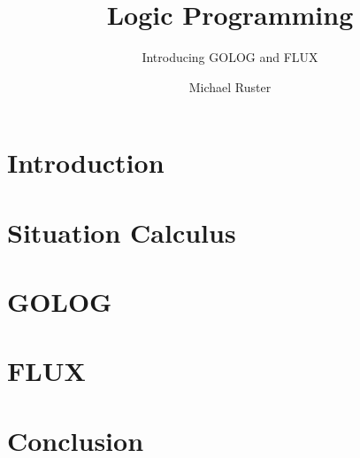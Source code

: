 \documentclass{../template/llncs}
\title{Logic Programming}
\subtitle{Introducing GOLOG and FLUX}
\author{Michael Ruster}
\institute{University Koblenz-Landau}
\begin{document}
\maketitle
\tableofcontents

\section{Introduction}


\section{Situation Calculus}\label{sitCalc}


\section{GOLOG}\label{golog}


\section{FLUX}\label{flux}


\section{Conclusion}\label{conclusion}



\clearpage

\end{document}

